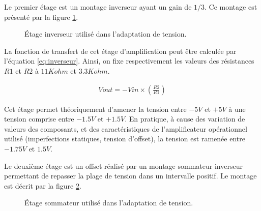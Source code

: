 \documentclass[letterpaper, twoside, 12pt, memoire, creativecommons, hyperref]{thETS}
\begin{document}
Le premier étage est un montage inverseur ayant un gain de $1/3$. Ce montage est présenté par la figure \ref{fig:inverseur}.

\begin{figure}
	\centering
	\caption{Étage inverseur utilisé dans l'adaptation de tension.}
	\label{fig:inverseur}
\end{figure}

La fonction de transfert de cet étage d'amplification peut être calculée par l'équation \ref{eq:inverseur}. Ainsi, on fixe respectivement les valeurs des résistances $R1$ et $R2$ à $11Kohm$ et $3.3Kohm$.

\begin{align}\label{eq:inverseur}
   Vout = -Vin \times ( \frac{R2}{R1} )
\end{align}

Cet étage permet théoriquement d'amener la tension entre $-5V$ et $+5V$ à une tension comprise entre $-1.5V$ et $+1.5V$. En pratique, à cause des variation de valeurs des composants, et des caractéristiques de l'amplificateur opérationnel utilisé (imperfections statiques, tension d'offset), la tension est ramenée entre $-1.75V$ et $1.5V$.

Le deuxième étage est un offset réalisé par un montage sommateur inverseur permettant de repasser la plage de tension dans un intervalle positif. Le montage est décrit par la figure \ref{fig:sommateur1}. 

\begin{figure}
	\centering
	\caption{Étage sommateur utilisé dans l'adaptation de tension.}
	\label{fig:sommateur1}
\end{figure}
\end{document}
